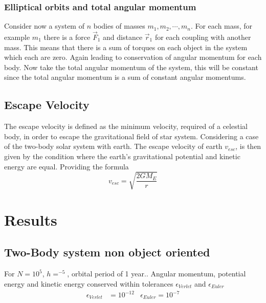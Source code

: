 \documentclass[aip,nobalancelastpage,
twocolumn,
rsi,%
 amsmath,amssymb,
 reprint,%
]{revtex4}
\begin{document}
\subsubsection{Elliptical orbits and total angular momentum}
Consider now a system of $n$ bodies of masses $m_1,m_2,\cdots,m_n$. For each mass, for example $m_1$ there is a force $\vec{F}_1$ and distance $\vec{r}_1$ for each coupling with another mass. This means that there is a sum of torques on each object in the system which each are zero. Again leading to conservation of angular momentum for each body. Now take the total angular momentum of the system, this will be constant since the total angular momentum is a sum of constant angular momentums.

\subsection{Escape Velocity}
The escape velocity is defined as the minimum velocity, required of a celestial body, in order to escape the gravitational field of star system. Considering a case of the two-body solar system with earth. The escape velocity of earth $v_{esc}$, is then given by the condition where the earth's gravitational potential and kinetic energy are equal. Providing the formula
\begin{equation}
v_{esc} = \sqrt{\frac{2 G M_E}{r}}
\end{equation}




\section{Results}
\subsection{Two-Body system non object oriented}
For $N=10^5$, $h=^{-5}$, orbital period of 1 year..
Angular momentum, potential energy and kinetic energy conserved within tolerances $\epsilon_{Verlet}$ and $\epsilon_{Euler}$
\begin{align*}
\epsilon_{Verlet} &= 10^{-12} & \epsilon_{Euler} = 10^{-7}
\end{align*}
\end{document}
